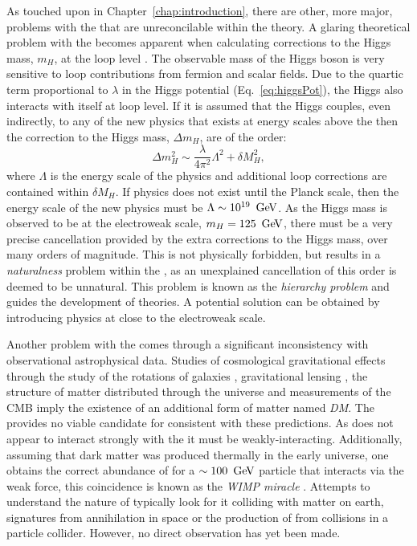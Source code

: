 As touched upon in Chapter~\ref{chap:introduction}, there are other,
more major, problems with the \SM that are unreconcilable within the
theory. A glaring theoretical problem with the \SM becomes apparent
when calculating corrections to the Higgs mass, $m_H$, at the loop
level \cite{Martin:1997ns}. The observable mass of the Higgs boson is
very sensitive to loop contributions from fermion and scalar fields.
Due to the quartic term proportional to $\lambda$ in the Higgs
potential (Eq.~\ref{eq:higgsPot}), the Higgs also interacts with itself
at loop level. If it is assumed that the Higgs couples, even indirectly, to
any of the new physics that exists at energy scales above the \SM then the
correction to the Higgs mass, $\Delta m_H$, are of the order:
\begin{equation}
\label{higgsmassscale}
\Delta m_H^2 \sim \frac{\lambda}{4\pi^2}\Lambda^2+\delta M_H^2,
\end{equation}
where $\Lambda$ is the energy scale of the \BSM physics and additional
loop corrections are contained within $\delta M_H$. If \BSM
physics does not exist until the Planck scale, then the energy scale
of the new physics must be $\Lambda\sim 10^{19}~\mathrm{\,Ge\kern -0.1em V}$. As the Higgs
mass is observed to be at the electroweak scale, $m_H=125~\mathrm{\,Ge\kern -0.1em V}$, there
must be a very precise cancellation provided by the extra corrections
to the Higgs mass, over many orders of magnitude. This is not
physically forbidden, but results in a \emph{naturalness} problem
within the \SM, as an unexplained cancellation of this order is deemed to
be unnatural. This problem is known as the \emph{hierarchy problem}
and guides the development of \BSM theories. A potential solution can
be obtained by introducing \BSM physics at close to the electroweak scale.

Another problem with the \SM comes through a significant inconsistency
with observational astrophysical data. Studies of cosmological
gravitational effects through the study of the rotations of galaxies
\cite{Kapteyn:1922zz,Oort:436532}, gravitational lensing
\cite{Markevitch:2003at}, the structure of matter distributed through
the universe \cite{2012Natur.487..202D} and measurements of the
\ac{CMB} \cite{Ade:2015xua,0067-0049-180-2-225} imply the existence of
an additional form of matter named \emph{\acf{DM}}. The \SM provides
no viable candidate for \DM consistent with these predictions. As \DM
does not appear to interact strongly with the \SM it must be
weakly-interacting. Additionally, assuming that dark matter was
produced thermally in the early universe, one obtains the correct
abundance of \DM for a $\sim 100~\mathrm{\,Ge\kern -0.1em V}$ particle that interacts via the
weak force, this coincidence is known as the \emph{WIMP miracle}
\cite{Jungman:1995df}. Attempts to understand the nature of \DM
typically look for it colliding with matter on earth, signatures from
\DM annihilation in space or the production of \DM from \SM collisions
in a particle collider. However, no direct observation has yet been
made. %

